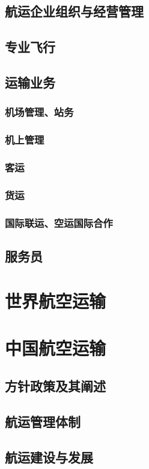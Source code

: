 \documentclass[UTF8]{../../RepresentationUniverse}
\begin{document}
    \subsection{航运企业组织与经营管理}
    \subsection{专业飞行}
    \subsection{运输业务}
        \subsubsection{机场管理、站务}
        \subsubsection{机上管理}
        \subsubsection{客运}
        \subsubsection{货运}
        \subsubsection{国际联运、空运国际合作}
    \subsection{服务员}

\section{世界航空运输}
\section{中国航空运输}
    \subsection{方针政策及其阐述}
    \subsection{航运管理体制}
    \subsection{航运建设与发展}
\end{document}
